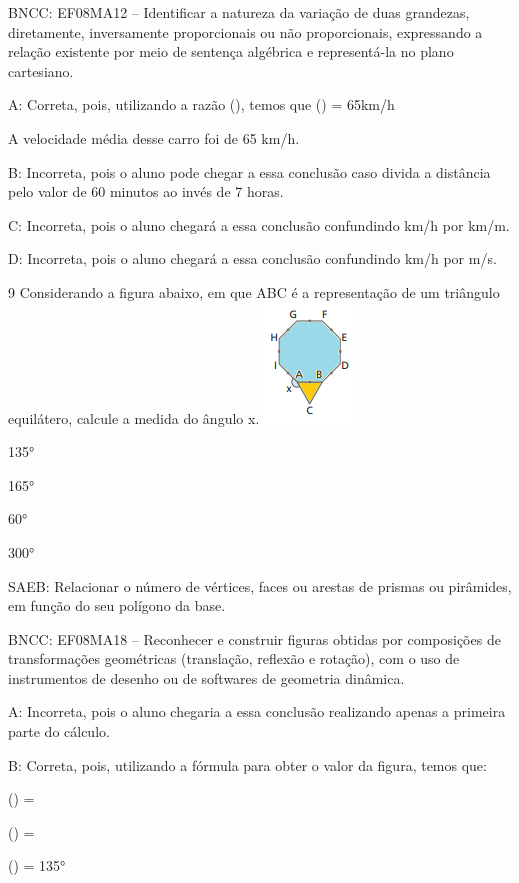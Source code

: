 {BNCC: EF08MA12 -- Identificar a natureza da variação de duas grandezas,
diretamente, inversamente proporcionais ou não proporcionais,
expressando a relação existente por meio de sentença algébrica e
representá-la no plano cartesiano.

A: Correta, pois, utilizando a razão (),
temos que () = 65km/h

A velocidade média desse carro foi de 65 km/h.

B: Incorreta, pois o aluno pode chegar a essa conclusão caso divida a
distância pelo valor de 60 minutos ao invés de 7 horas.

C: Incorreta, pois o aluno chegará a essa conclusão confundindo km/h por
km/m.

D: Incorreta, pois o aluno chegará a essa conclusão confundindo km/h por
m/s.

\num{9} Considerando a figura abaixo, em que ABC é a representação de um
triângulo equilátero, calcule a medida do ângulo x.
\includegraphics[width=0.98958in,height=1.26042in]{./imgSAEB_8_MAT/media/image56.png}
\item 135°
\item 165°
\item 60°
\item 300°

SAEB: Relacionar o número de vértices, faces ou arestas de prismas ou
pirâmides, em função do seu polígono da base.

BNCC: EF08MA18 -- Reconhecer e construir figuras obtidas por composições
de transformações geométricas (translação, reflexão e rotação), com o
uso de instrumentos de desenho ou de softwares de geometria dinâmica.

A: Incorreta, pois o aluno chegaria a essa conclusão realizando apenas a
primeira parte do cálculo.

B: Correta, pois, utilizando a fórmula para obter o valor da figura,
temos que:

() =

() =

() = 135°

}
